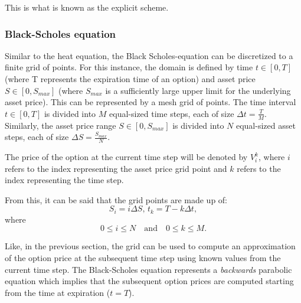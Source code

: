 This is what is known as the explicit scheme.

\subsubsection{Black-Scholes equation}
Similar to the heat equation, the Black Scholes-equation can be discretized to a finite grid of points. For this instance, the domain is defined by time $t \in [0, T]$ (where T represents the expiration time of an option) and asset price $S \in [0,S_{max}]$ (where $S_{max}$ is a sufficiently large upper limit for the underlying asset price). This can be represented by a mesh grid of points.
The time interval $t \in [0, T]$ is divided into $M$ equal-sized time steps, each of size ${\Delta t} = \frac{T}{M}$. Similarly, the asset price range $S \in [0,S_{max}]$ is divided into $N$ equal-sized asset steps, each of size ${\Delta S} = \frac{S_{max}}{N}$.

The price of the option at the current time step will be denoted by $V_i^k$, where $i$ refers to the index representing the asset price grid point  
and $k$ refers to the index representing the time step.

From this, it can be said that the grid points are made up of:
\[
S_i = i {\Delta S},\, t_k = T - k {\Delta t},
\]
where
\[
0 \leq i \leq N \quad \text{and} \quad 0 \leq k \leq M.
\]

Like, in the previous section, the grid can be used to compute an approximation of the option price at the subsequent time step using known values from the current time step. The Black-Scholes equation represents a \textit{backwards} parabolic equation which implies that the subsequent option prices are computed starting from the time at expiration ($t = T$). 

